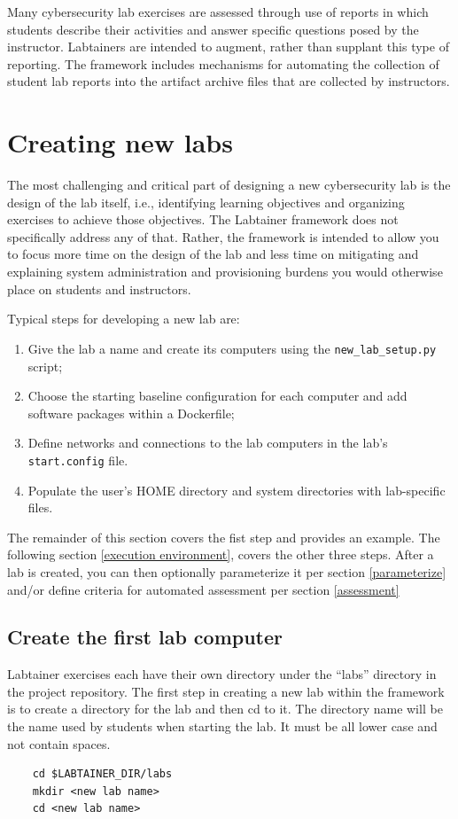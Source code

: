 \documentclass[12pt]{article}
\begin{document}
Many cybersecurity lab exercises are assessed through use of reports in which students
describe their activities and answer specific questions posed by the instructor.  Labtainers
are intended to augment, rather than supplant this type of reporting.  The framework includes
mechanisms for automating the collection of student lab reports into the artifact archive files
that are collected by instructors. 


\section {Creating new labs}
\label{sec:new_labs}
The most challenging and critical part of designing a new cybersecurity lab
is the design of the lab itself, i.e., identifying learning objectives and
organizing exercises to achieve those objectives.  The Labtainer framework
does not specifically address any of that.  Rather, the framework is intended
to allow you to focus more time on the design of the lab and less time on mitigating and
explaining system administration and provisioning burdens you would otherwise place on 
students and instructors.

Typical steps for developing a new lab are:
\begin{enumerate}
\item Give the lab a name and create its computers using the {\tt new\_lab\_setup.py} script;
\item Choose the starting baseline configuration for each computer and add software packages
within a Dockerfile;
\item Define networks and connections to the lab computers in the lab's {\tt start.config} file.
\item Populate the user's HOME directory and system directories with lab-specific files.
\end{enumerate}
The remainder of this section covers the fist step and provides an example.  The 
following section \ref{execution environment}, covers the other three
steps.  After a lab is created, you can then optionally parameterize it per section \ref{parameterize} and/or
define criteria for automated assessment per section \ref{assessment}

\subsection{Create the first lab computer}
Labtainer exercises each have their own
directory under the ``labs'' directory in the project repository.
The first step in creating a new lab within the framework is to create
a directory for the lab and then cd to it.  The directory name will be the name
used by students when starting the lab.  It must be all lower case and not contain spaces.
\begin{verbatim}
    cd $LABTAINER_DIR/labs
    mkdir <new lab name>
    cd <new lab name>
\end{verbatim}
\end{document}
